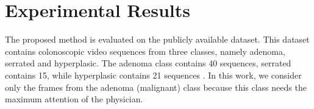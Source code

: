 \documentclass[journal]{IEEEtran}
\begin{document}
%



\section{Experimental Results}
The proposed method is evaluated on the publicly available dataset. This dataset contains colonoscopic video sequences from three classes, namely adenoma, serrated and hyperplasic. The adenoma class contains 40 sequences, serrated contains 15, while hyperplasic contains 21 sequences \cite{mesejo2016computer}. In this work, we consider only the frames from the adenoma (malignant) class because this class needs the maximum attention of the physician.
\end{document}

